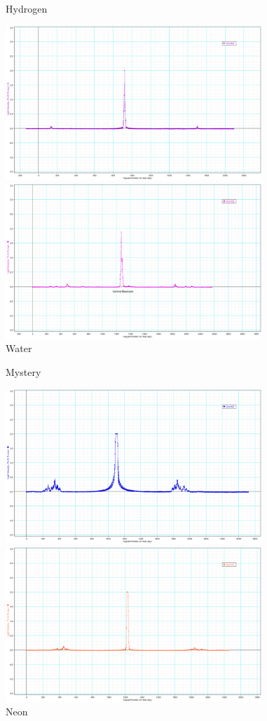 \documentclass[11.8pt]{amsart}
\begin{document}
\begin{figure}[H]
    \begin{minipage}{.5\textwidth}
        \caption{Hydrogen}
        \includegraphics[height=2.3in]{hy.png}
    \end{minipage}%
    \begin{minipage}{.5\textwidth}
        \caption{Water}
        \includegraphics[height=2.3in]{water.png}
    \end{minipage}%
\end{figure}
\vfill
\begin{figure}[H]
    \begin{minipage}{.5\textwidth}
        \caption{Mystery}
        \includegraphics[height=2.3in]{myst.png}
    \end{minipage}%
    \begin{minipage}{.5\textwidth}
        \caption{Neon}
        \includegraphics[height=2.3in]{neon.png}
    \end{minipage}%
\end{figure}
\end{document}
